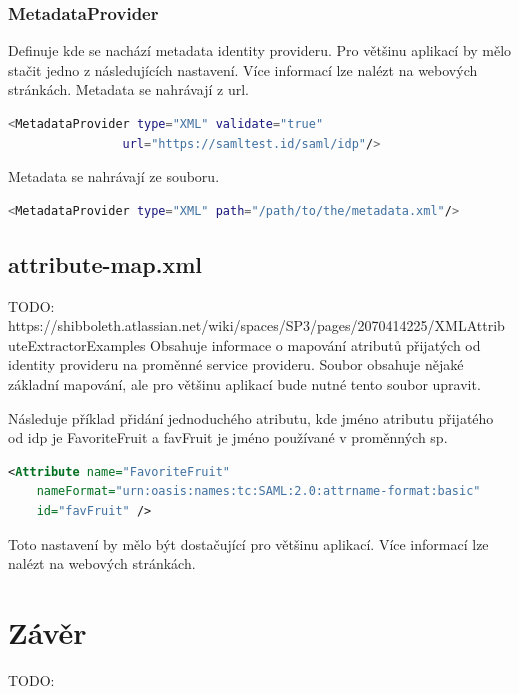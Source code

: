 \subsection{MetadataProvider}
Definuje kde se nachází metadata identity provideru. Pro většinu aplikací by mělo stačit jedno z následujících nastavení. Více informací lze nalézt na webových stránkách\cite{MetadataProvider}.
\linebreak \linebreak
Metadata se nahrávají z url.
\begin{lstlisting}[language=Bash]
 <MetadataProvider type="XML" validate="true"
                url="https://samltest.id/saml/idp"/>
\end{lstlisting}
Metadata se nahrávají ze souboru.
\begin{lstlisting}[language=Bash]
 <MetadataProvider type="XML" path="/path/to/the/metadata.xml"/>
\end{lstlisting}


\section{attribute-map.xml}
TODO: https://shibboleth.atlassian.net/wiki/spaces/SP3/pages/2070414225/XMLAttributeExtractorExamples
Obsahuje informace o mapování atributů přijatých od identity provideru na proměnné service provideru. Soubor obsahuje nějaké základní mapování, ale pro většinu aplikací bude nutné tento soubor upravit.

Následuje příklad přidání jednoduchého atributu, kde jméno atributu přijatého od idp je FavoriteFruit a favFruit je jméno používané v proměnných sp\cite{AddAttribute}.
 \begin{lstlisting}[language=XML]
     <Attribute name="FavoriteFruit"
    nameFormat="urn:oasis:names:tc:SAML:2.0:attrname-format:basic"
    id="favFruit" />
    \end{lstlisting}
    
Toto nastavení by mělo být dostačující pro většinu aplikací. Více informací lze nalézt na webových stránkách\cite{AddAttribute}.

\chapter{Závěr}
TODO:
\label{zaver}






